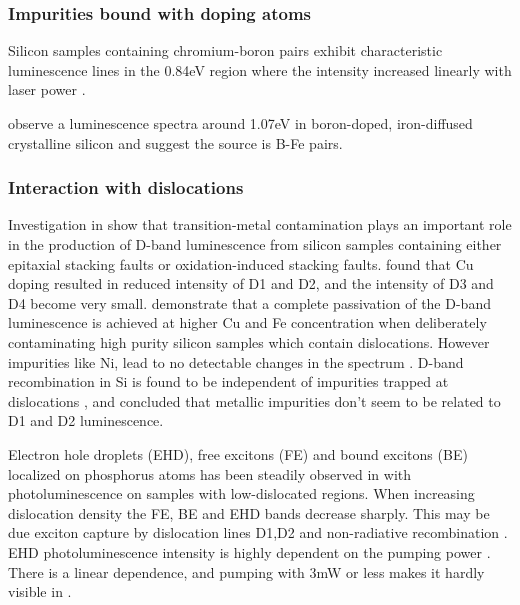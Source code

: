 \subsubsection{Impurities bound with doping atoms}

Silicon samples containing chromium-boron pairs exhibit characteristic luminescence lines in the 0.84eV region where the intensity increased linearly with laser power \cite{conzelmann83}. 

\cite{mohring83} observe a luminescence spectra around 1.07eV in boron-doped, iron-diffused crystalline silicon and suggest the source is B-Fe pairs.

\subsubsection{Interaction with dislocations}

Investigation in \cite{higgs92} show that transition-metal contamination plays an important role in the production of D-band luminescence from silicon samples containing either epitaxial stacking faults or oxidation-induced stacking faults. \cite{staiger94} found that Cu doping resulted in reduced intensity of D1 and D2, and the intensity of D3 and D4 become very small. \cite{weronek91} demonstrate that a complete passivation of the D-band luminescence is achieved at higher Cu and Fe concentration when deliberately contaminating high purity silicon samples which contain dislocations. However impurities like Ni, lead to no detectable changes in the spectrum \cite{weronek91}. D-band recombination in Si is found to be independent of impurities trapped at dislocations \cite{weronek91}, and \cite{sekiguchi95} concluded that metallic impurities don't seem to be related to D1 and D2 luminescence. %

Electron hole droplets (EHD), free excitons (FE) and bound excitons (BE) localized on phosphorus atoms has been steadily observed in \cite{drozdov03} with photoluminescence on samples with low-dislocated regions. When increasing dislocation density the FE, BE and EHD bands decrease sharply. This may be due exciton capture by dislocation lines D1,D2 and non-radiative recombination \cite{drozdov03}. EHD photoluminescence intensity is highly dependent on the pumping power \cite{satoshi04}. There is a linear dependence, and pumping with 3mW or less makes it hardly visible in \cite{satoshi04}.

